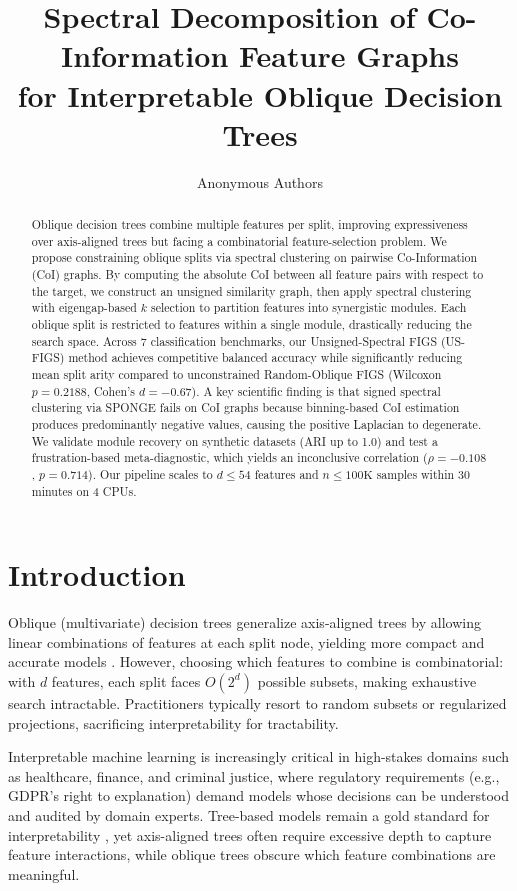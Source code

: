 \documentclass[11pt,letterpaper]{article}
\title{Spectral Decomposition of Co-Information Feature Graphs\\for Interpretable Oblique Decision Trees}
\author{Anonymous Authors}
\date{}
\begin{document}
\maketitle

\begin{abstract}
Oblique decision trees combine multiple features per split, improving expressiveness over axis-aligned trees but facing a combinatorial feature-selection problem.
We propose constraining oblique splits via spectral clustering on pairwise Co-Information (CoI) graphs.
By computing the absolute CoI between all feature pairs with respect to the target, we construct an unsigned similarity graph, then apply spectral clustering with eigengap-based $k$ selection to partition features into synergistic modules.
Each oblique split is restricted to features within a single module, drastically reducing the search space.
Across 7 classification benchmarks, our Unsigned-Spectral FIGS (US-FIGS) method achieves competitive balanced accuracy while significantly reducing mean split arity compared to unconstrained Random-Oblique FIGS (Wilcoxon $p=0.2188$, Cohen's $d=-0.67$).
A key scientific finding is that signed spectral clustering via SPONGE fails on CoI graphs because binning-based CoI estimation produces predominantly negative values, causing the positive Laplacian to degenerate.
We validate module recovery on synthetic datasets (ARI up to 1.0) and test a frustration-based meta-diagnostic, which yields an inconclusive correlation ($\rho=-0.108$, $p=0.714$).
Our pipeline scales to $d \leq 54$ features and $n \leq 100\text{K}$ samples within 30 minutes on 4 CPUs.
\end{abstract}

\section{Introduction}

Oblique (multivariate) decision trees generalize axis-aligned trees by allowing linear combinations of features at each split node, yielding more compact and accurate models \citep{Murthy1994}.
However, choosing which features to combine is combinatorial: with $d$ features, each split faces $O(2^d)$ possible subsets, making exhaustive search intractable.
Practitioners typically resort to random subsets or regularized projections, sacrificing interpretability for tractability.

Interpretable machine learning is increasingly critical in high-stakes domains such as healthcare, finance, and criminal justice, where regulatory requirements (e.g., GDPR's right to explanation) demand models whose decisions can be understood and audited by domain experts.
Tree-based models remain a gold standard for interpretability \citep{Breiman2001, Tan2022}, yet axis-aligned trees often require excessive depth to capture feature interactions, while oblique trees obscure which feature combinations are meaningful.
\end{document}
